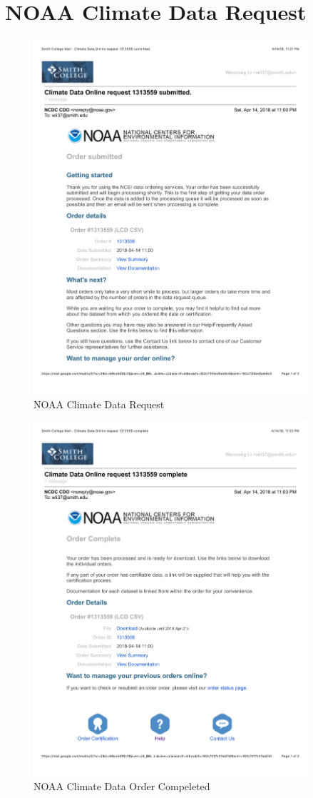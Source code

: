 \documentclass[12pt,twoside]{reedthesis}
\theoremstyle{definition}
\theoremstyle{definition}
\theoremstyle{definition}
\theoremstyle{remark}
\begin{document}
\chapter{NOAA Climate Data Request}\label{noaa-climate-data-request}
\begin{figure}
  \centering
  \includegraphics[width=4in]{figure/app_noaa_request.pdf}
  \caption{NOAA Climate Data Request}
\end{figure}
\begin{figure}
  \centering
  \includegraphics[width=4in]{figure/app_noaa_com.pdf}
  \caption{NOAA Climate Data Order Compeleted}
\end{figure}
\backmatter
\end{document}
